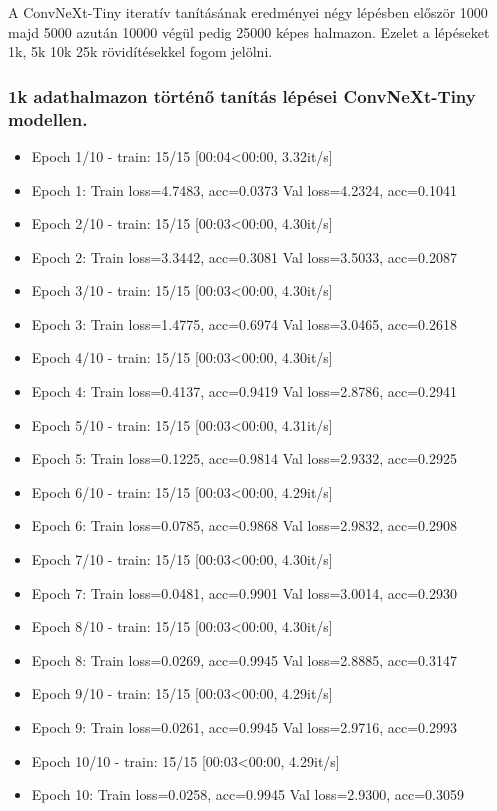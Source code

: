 A ConvNeXt-Tiny iteratív tanításának eredményei négy lépésben először 1000 majd 5000 azután 10000 végül pedig 25000 képes halmazon. Ezelet a lépéseket 1k, 5k 10k 25k rövidítésekkel fogom jelölni.

\subsubsection{1k adathalmazon történő tanítás lépései ConvNeXt-Tiny modellen.}
  \begin{itemize} 
    \item Epoch 1/10 - train: 15/15 [00:04<00:00,  3.32it/s]
    \item Epoch 1: Train loss=4.7483, acc=0.0373 Val loss=4.2324, acc=0.1041
    \item Epoch 2/10 - train: 15/15 [00:03<00:00,  4.30it/s]
    \item Epoch 2: Train loss=3.3442, acc=0.3081 Val loss=3.5033, acc=0.2087
    \item Epoch 3/10 - train: 15/15 [00:03<00:00,  4.30it/s]
    \item Epoch 3: Train loss=1.4775, acc=0.6974 Val loss=3.0465, acc=0.2618
    \item Epoch 4/10 - train: 15/15 [00:03<00:00,  4.30it/s]
    \item Epoch 4: Train loss=0.4137, acc=0.9419 Val loss=2.8786, acc=0.2941
    \item Epoch 5/10 - train: 15/15 [00:03<00:00,  4.31it/s]
    \item Epoch 5: Train loss=0.1225, acc=0.9814 Val loss=2.9332, acc=0.2925
    \item Epoch 6/10 - train: 15/15 [00:03<00:00,  4.29it/s]
    \item Epoch 6: Train loss=0.0785, acc=0.9868 Val loss=2.9832, acc=0.2908
    \item Epoch 7/10 - train: 15/15 [00:03<00:00,  4.30it/s]
    \item Epoch 7: Train loss=0.0481, acc=0.9901 Val loss=3.0014, acc=0.2930
    \item Epoch 8/10 - train: 15/15 [00:03<00:00,  4.30it/s]
    \item Epoch 8: Train loss=0.0269, acc=0.9945 Val loss=2.8885, acc=0.3147
    \item Epoch 9/10 - train: 15/15 [00:03<00:00,  4.29it/s]
    \item Epoch 9: Train loss=0.0261, acc=0.9945 Val loss=2.9716, acc=0.2993
    \item Epoch 10/10 - train: 15/15 [00:03<00:00,  4.29it/s]
    \item Epoch 10: Train loss=0.0258, acc=0.9945 Val loss=2.9300, acc=0.3059
  \end{itemize}

